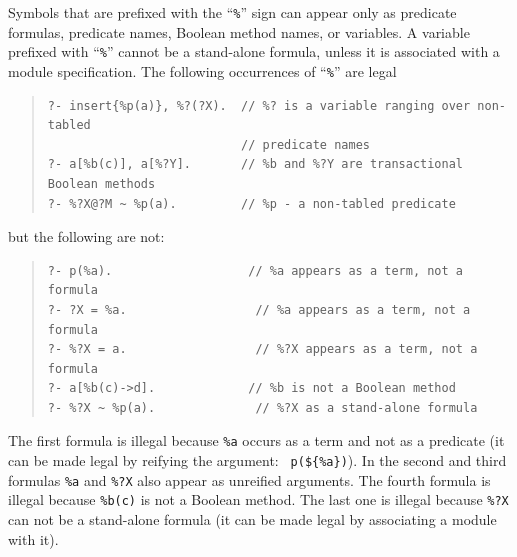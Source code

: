 \documentclass[11pt]{article}
\begin{document}
Symbols that are prefixed with the ``\verb|%|'' sign
can appear only as predicate formulas, predicate names, Boolean
method names, or variables.  A variable prefixed with ``\verb|%|'' cannot be
a stand-alone formula, unless it is associated with a module
specification. The following occurrences of ``\verb|%|'' are legal
\begin{quote}
\begin{verbatim}
?- insert{%p(a)}, %?(?X).  // %? is a variable ranging over non-tabled 
                           // predicate names
?- a[%b(c)], a[%?Y].       // %b and %?Y are transactional Boolean methods
?- %?X@?M ~ %p(a).         // %p - a non-tabled predicate

\end{verbatim}
\end{quote}
but the following are not:
\begin{quote}
\begin{verbatim}
?- p(%a).                   // %a appears as a term, not a formula
?- ?X = %a.                  // %a appears as a term, not a formula
?- %?X = a.                  // %?X appears as a term, not a formula
?- a[%b(c)->d].             // %b is not a Boolean method
?- %?X ~ %p(a).              // %?X as a stand-alone formula
\end{verbatim}
\end{quote}
The first formula is illegal because {\tt \%a} occurs as a term and not
as a predicate (it can be made legal by reifying the argument: {\tt
p(\$\{\%a\})}). In the second and third formulas {\tt \%a} and {\tt \%?X}
also appear as unreified arguments. The fourth formula is illegal
because {\tt \%b(c)} is not a Boolean method. The last one is illegal
because {\tt \%?X} can not be a stand-alone formula (it can be made legal
by associating a module with it).
\end{document}
